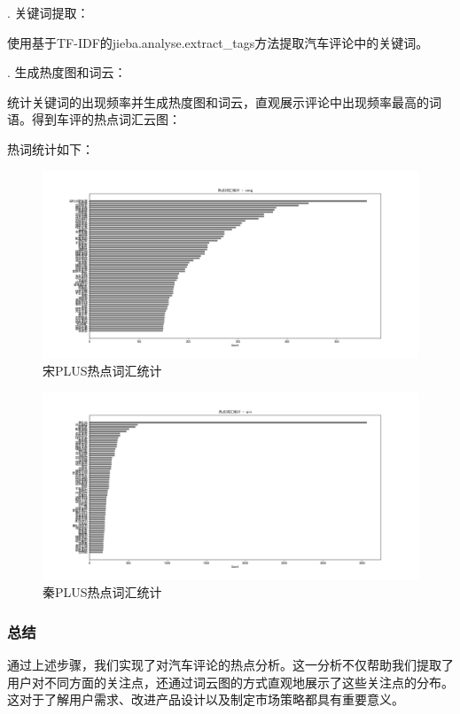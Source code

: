 \documentclass[UTF8,a4paper,15pt,titlepage,oneside]{ctexbook}
\begin{document}
. 关键词提取：

使用基于TF-IDF的jieba.analyse.extract\_tags方法提取汽车评论中的关键词。

. 生成热度图和词云：

统计关键词的出现频率并生成热度图和词云，直观展示评论中出现频率最高的词语。得到车评的热点词汇云图：

热词统计如下：


\begin{figure}[htbp]
  \centering
  
    \includegraphics[width=\linewidth]{pictures/54.png}
    \caption{宋PLUS热点词汇统计}
  \end{figure}

  \begin{figure}[htbp]
    \centering
    \includegraphics[width=\linewidth]{pictures/55.png}
    \caption{秦PLUS热点词汇统计}
    \end{figure}
  

\subsubsection{总结}

通过上述步骤，我们实现了对汽车评论的热点分析。这一分析不仅帮助我们提取了用户对不同方面的关注点，还通过词云图的方式直观地展示了这些关注点的分布。这对于了解用户需求、改进产品设计以及制定市场策略都具有重要意义。
\end{document}
